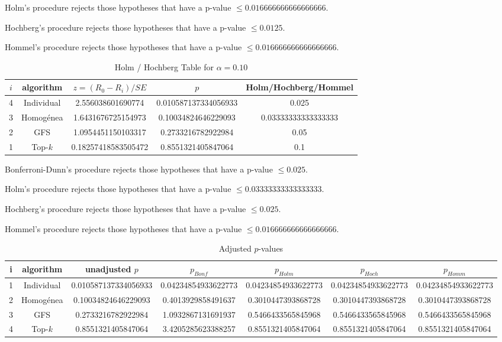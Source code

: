 \documentclass[a4paper,10pt]{article}
\begin{document}
\begin{landscape}
Holm's procedure rejects those hypotheses that have a p-value $\le0.016666666666666666$.


Hochberg's procedure rejects those hypotheses that have a p-value $\le0.0125$.


Hommel's procedure rejects those hypotheses that have a p-value $\le0.016666666666666666$.


\begin{table}[!htp]
\centering\tiny
\caption{Holm / Hochberg Table for $\alpha=0.10$}
\begin{tabular}{ccccc}
$i$&algorithm&$z=(R_0 - R_i)/SE$&$p$&Holm/Hochberg/Hommel\\
\hline
4&Individual&2.556038601690774&0.010587137334056933&0.025\\
3&Homogénea&1.6431676725154973&0.10034824646229093&0.03333333333333333\\
2&GFS&1.0954451150103317&0.2733216782922984&0.05\\
1&Top-$k$&0.18257418583505472&0.8551321405847064&0.1\\
\hline
\end{tabular}
\end{table}
Bonferroni-Dunn's procedure rejects those hypotheses that have a p-value $\le0.025$.


Holm's procedure rejects those hypotheses that have a p-value $\le0.03333333333333333$.


Hochberg's procedure rejects those hypotheses that have a p-value $\le0.025$.


Hommel's procedure rejects those hypotheses that have a p-value $\le0.016666666666666666$.


\begin{table}[!htp]
\centering\tiny
\caption{Adjusted $p$-values}
\begin{tabular}{ccccccc}
i&algorithm&unadjusted $p$&$p_{Bonf}$&$p_{Holm}$&$p_{Hoch}$&$p_{Homm}$\\
\hline
1&Individual&0.010587137334056933&0.04234854933622773&0.04234854933622773&0.04234854933622773&0.04234854933622773\\
2&Homogénea&0.10034824646229093&0.4013929858491637&0.3010447393868728&0.3010447393868728&0.3010447393868728\\
3&GFS&0.2733216782922984&1.0932867131691937&0.5466433565845968&0.5466433565845968&0.5466433565845968\\
4&Top-$k$&0.8551321405847064&3.4205285623388257&0.8551321405847064&0.8551321405847064&0.8551321405847064\\
\hline
\end{tabular}
\end{table}


\end{landscape}
\end{document}
